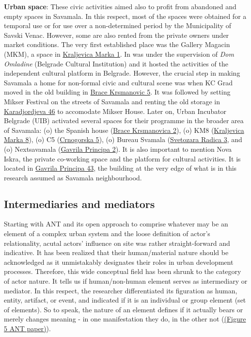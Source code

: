 \documentclass[11pt]{report}
\begin{document}
\begin{itemize}
\textbf{Urban space}:
These civic activities aimed also to profit from abandoned and empty spaces in Savamala.
In this respect, most of the spaces were obtained for a temporal use or for use over a non-determined period by the Municipality of Savski Venac.
However, some are also rented from the private owners under market conditions.
The very first established place was the Gallery Magacin (MKM), a space in \underline{Kraljevica Marka 1}.
In was under the supervision of \textit{Dom Omladine} (Belgrade Cultural Institution) and it hosted the activities of the independent cultural platform in Belgrade.
However, the crucial step in making Savamala a home for non-formal civic and cultural scene was when KC Grad moved in the old building in \underline{Brace Krsmanovic 5}.
It was followed by setting Mikser Festival on the streets of Savamala and renting the old storage in \underline{Karadjordjeva 46} to accomodate Mikser House. Later on, Urban Incubator Belgrade (UIB) activated several spaces for their programme in the broader area of Savamala:
(o) the Spanish house (\underline{Brace Krsmanovica 2}),
(o) KM8 (\underline{Kraljevica Marka 8}),
(o) C5 (\underline{Crnogorska 5}),
(o) Bureau Svamala (\underline{Svetozara Radica 3},
and
(o) Nextsavamala (\underline{Gavrila Principa 2}). 
It is also important to mention Nova Iskra, the private co-working space and the platform for cultural activities. It is located in \underline{Gavrila Principa 43}, the building at the very edge of what is in this research assumed as Savamala neighbourhood.
\end{itemize}
 
\subsection{Intermediaries and mediators}

Starting with ANT and its open approach to comprise whatever may be an element of a complex urban system and the loose definition of actor’s relationality, 
acutal actors’ influence on site was rather straight-forward and indicative.
It has been realized that their human/material nature should be acknowledged as it unmistakably designates their roles in urban development processes.
Therefore, this wide conceptual field has been shrunk to the category of actor nature.
It tells us if human/non-human element serves as intermediary or mediator.
In this respect, the researcher differentiated its figuration as human, entity, artifact, or event, and  indicated if it is an individual or group element (set of elements).
So to speak, the nature of an element defines if it actually bears or merely changes meaning - in one manifestation they do, in the other not (\href{}{(Figure 5 ANT paper)}).
\end{document}
